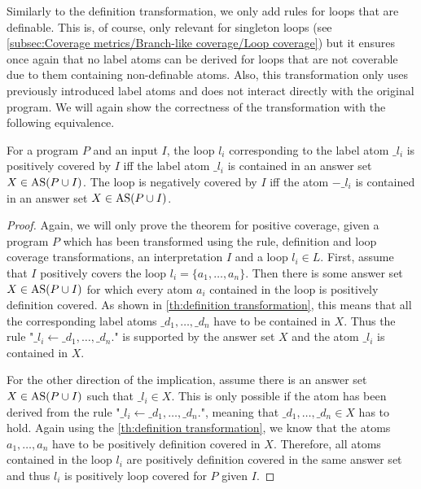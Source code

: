 Similarly to the definition transformation, we only add rules for loops that are definable. This is, of course, only relevant for singleton loops (see \cref{subsec:Coverage metrics/Branch-like coverage/Loop coverage}) but it ensures once again that no label atoms can be derived for loops that are not coverable due to them containing non-definable atoms.
Also, this transformation only uses previously introduced label atoms and does not interact directly with the original program. We will again show the correctness of the transformation with the following equivalence.

\begin{theorem}
\label{th:loop transformation}
    For a program $P$ and an input $I$, the loop $l_i$ corresponding to the label atom $\_l_i$ is positively covered by $I$ iff the label atom $\_l_i$ is contained in an answer set \(X \in \operatorname{AS}(P \cup I)\). The loop is negatively covered by $I$ iff the atom $-\_l_i$ is contained in an answer set \(X \in \operatorname{AS}(P \cup I)\).
\end{theorem}

\begin{proof}
\label{pr:loop transformation}
    Again, we will only prove the theorem for positive coverage, given a program $P$ which has been transformed using the rule, definition and loop coverage transformations, an interpretation $I$ and a loop \(l_i \in L\). First, assume that $I$ positively covers the loop \(l_i = \{a_1, \ldots, a_n\}\). Then there is some answer set \(X \in \operatorname{AS}(P \cup I)\) for which every atom $a_i$ contained in the loop is positively definition covered. As shown in \cref{th:definition transformation}, this means that all the corresponding label atoms \(\_d_1, \ldots, \_d_n\) have to be contained in $X$. Thus the rule "\(\_l_i \leftarrow \_d_1, \ldots, \_d_n.\)" is supported by the answer set $X$ and the atom $\_l_i$ is contained in $X$.

    For the other direction of the implication, assume there is an answer set \(X \in \operatorname{AS}(P \cup I)\) such that \(\_l_i \in X\). This is only possible if the atom has been derived from the rule "\(\_l_i \leftarrow \_d_1, \ldots, \_d_n.\)", meaning that \(\_d_1, \ldots, \_d_n \in X\) has to hold. Again using the \cref{th:definition transformation}, we know that the atoms \(a_1, \ldots, a_n\) have to be positively definition covered in $X$. Therefore, all atoms contained in the loop $l_i$ are positively definition covered in the same answer set and thus $l_i$ is positively loop covered for $P$ given $I$.
\end{proof}


